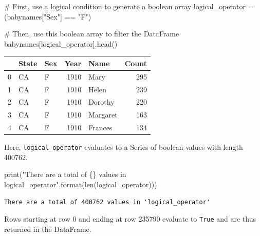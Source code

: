 \documentclass[
  letterpaper,
  DIV=11,
  numbers=noendperiod]{scrreprt}
\newenvironment{Shaded}{\begin{snugshade}}{\end{snugshade}}
\newcommand{\BuiltInTok}[1]{\textcolor[rgb]{0.00,0.23,0.31}{#1}}
\newcommand{\CommentTok}[1]{\textcolor[rgb]{0.37,0.37,0.37}{#1}}
\newcommand{\NormalTok}[1]{\textcolor[rgb]{0.00,0.23,0.31}{#1}}
\newcommand{\OperatorTok}[1]{\textcolor[rgb]{0.37,0.37,0.37}{#1}}
\newcommand{\SpecialCharTok}[1]{\textcolor[rgb]{0.37,0.37,0.37}{#1}}
\newcommand{\StringTok}[1]{\textcolor[rgb]{0.13,0.47,0.30}{#1}}
\begin{document}
\begin{Shaded}
\begin{Highlighting}[]
\CommentTok{\# First, use a logical condition to generate a boolean array}
\NormalTok{logical\_operator }\OperatorTok{=}\NormalTok{ (babynames[}\StringTok{"Sex"}\NormalTok{] }\OperatorTok{==} \StringTok{"F"}\NormalTok{)}

\CommentTok{\# Then, use this boolean array to filter the DataFrame}
\NormalTok{babynames[logical\_operator].head()}
\end{Highlighting}
\end{Shaded}

\begin{tabular}{lllrlr}
\toprule
{} & State & Sex &  Year &      Name &  Count \\
\midrule
0 &    CA &   F &  1910 &      Mary &    295 \\
1 &    CA &   F &  1910 &     Helen &    239 \\
2 &    CA &   F &  1910 &   Dorothy &    220 \\
3 &    CA &   F &  1910 &  Margaret &    163 \\
4 &    CA &   F &  1910 &   Frances &    134 \\
\bottomrule
\end{tabular}

Here, \texttt{logical\_operator} evaluates to a Series of boolean values
with length 400762.

\begin{Shaded}
\begin{Highlighting}[]
\BuiltInTok{print}\NormalTok{(}\StringTok{"There are a total of }\SpecialCharTok{\{\}}\StringTok{ values in \textquotesingle{}logical\_operator\textquotesingle{}"}\NormalTok{.}\BuiltInTok{format}\NormalTok{(}\BuiltInTok{len}\NormalTok{(logical\_operator)))}
\end{Highlighting}
\end{Shaded}

\begin{verbatim}
There are a total of 400762 values in 'logical_operator'
\end{verbatim}

Rows starting at row 0 and ending at row 235790 evaluate to
\texttt{True} and are thus returned in the DataFrame.
\end{document}
